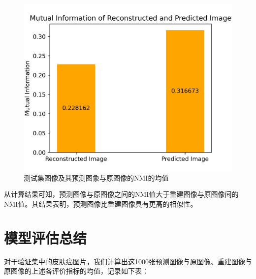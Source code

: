 \begin{figure}[h]
	\centering
	\includegraphics[width=0.75\columnwidth]{image/chap06/img611.png}
	\caption{测试集图像及其预测图象与原图像的NMI的均值}
	\label{fig611}
\end{figure}

从计算结果可知，预测图像与原图像之间的NMI值大于重建图像与原图像间的NMI值。其结果表明，预测图像比重建图像具有更高的相似性。

\section{模型评估总结}
对于验证集中的皮肤癌图片，我们计算出这1000张预测图像与原图像、重建图像与原图像的上述各评价指标的均值，记录如下表：


